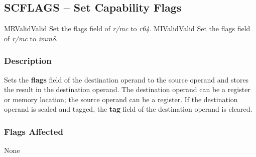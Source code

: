 \clearpage
{}
{}
\subsection*{SCFLAGS -- Set Capability Flags}

\begin{x86opcodetable}
  {MR}{Valid}{Valid}
  {Set the flags field of \emph{r/mc} to \emph{r64}.}
  {MI}{Valid}{Valid}
  {Set the flags field of \emph{r/mc} to \emph{imm8}.}
\end{x86opcodetable}

\begin{x86opentable}
\end{x86opentable}

\subsubsection*{Description}

Sets the \textbf{flags} field of the destination operand to the
source operand and stores the result in the destination operand.  The
destination operand can be a register or memory location; the source
operand can be a register.  If the destination operand is sealed and
tagged, the \textbf{tag} field of the destination operand is cleared.

\subsubsection*{Flags Affected}

None
